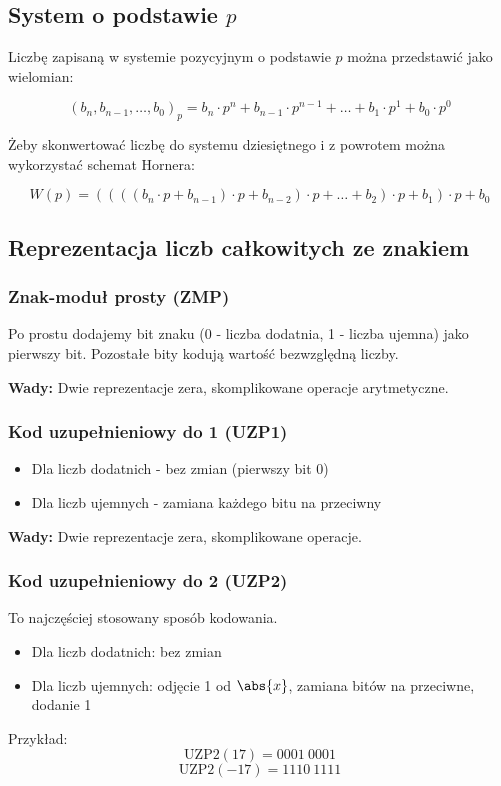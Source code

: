 \subsection{System o podstawie \( p \)}

Liczbę zapisaną w systemie pozycyjnym o podstawie \( p \) można przedstawić jako wielomian:

\[
    (b_n, b_{n-1}, \dots, b_0)_p = b_n \cdot p^n + b_{n-1} \cdot p^{n-1} + \ldots + b_1 \cdot p^1 + b_0 \cdot p^0
\]

Żeby skonwertować liczbę do systemu dziesiętnego i z powrotem można wykorzystać schemat Hornera:

\[
    W(p) = ((((b_n \cdot p + b_{n-1}) \cdot p + b_{n-2}) \cdot p + \ldots + b_2) \cdot p + b_1) \cdot p + b_0
\]

\subsection{Reprezentacja liczb całkowitych ze znakiem}
\subsubsection*{Znak-moduł prosty (ZMP)}
Po prostu dodajemy bit znaku (0 - liczba dodatnia, 1 - liczba ujemna) jako pierwszy bit. Pozostałe bity kodują wartość bezwzględną liczby.

\textbf{Wady:} Dwie reprezentacje zera, skomplikowane operacje arytmetyczne.

\subsubsection*{Kod uzupełnieniowy do 1 (UZP1)}
\begin{itemize}
    \item Dla liczb dodatnich - bez zmian (pierwszy bit 0)
    \item Dla liczb ujemnych - zamiana każdego bitu na przeciwny
\end{itemize}

\textbf{Wady:} Dwie reprezentacje zera, skomplikowane operacje.

\subsubsection*{Kod uzupełnieniowy do 2 (UZP2)}
To najczęściej stosowany sposób kodowania.
\begin{itemize}
    \item Dla liczb dodatnich: bez zmian
    \item Dla liczb ujemnych: odjęcie 1 od \( \abs{x} \), zamiana bitów na przeciwne, dodanie 1
\end{itemize}
Przykład:
\[
    \text{UZP2}(17) = 0001 \ 0001
\]
\[
    \text{UZP2}(-17) = 1110 \ 1111
\]

